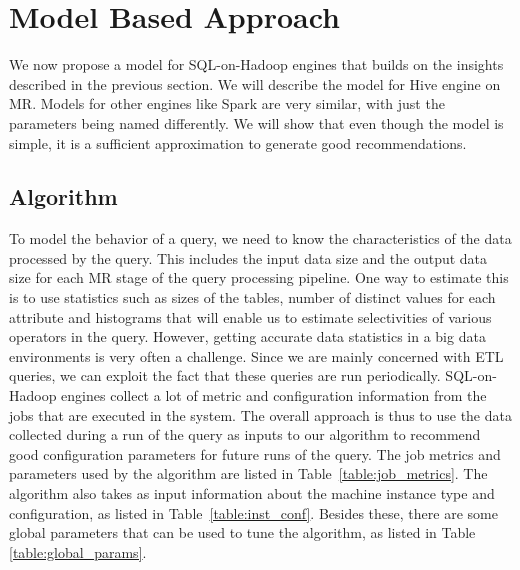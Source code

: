 \section{Model Based Approach}
\label{sec:modelbased}
We now propose a model for SQL-on-Hadoop engines that builds on the insights described in the previous section. We will describe the model for Hive engine on MR. Models for other engines like Spark are very similar, with just the parameters being named differently.  We will show that even though the model is simple, it is a sufficient approximation to generate good recommendations. 

\subsection{Algorithm}
To model the behavior of a query, we need to know the characteristics of the data processed by the query. This includes the input data size and the output data size for each MR stage of the query processing pipeline. One way to estimate this is to use statistics such as sizes of the tables, number of distinct values for each attribute and histograms that will enable us to estimate selectivities of various operators in the query. However, getting accurate data statistics in a big data environments is very often a challenge. Since we are mainly concerned with ETL queries, we can exploit the fact that these queries are run periodically. SQL-on-Hadoop engines collect a lot of metric and configuration information from the jobs that are executed in the system. The overall approach is thus to use the data collected during a run of the query as inputs to our algorithm to recommend good configuration parameters for future runs of the query. The job metrics and parameters used by the algorithm are listed in Table~\ref{table:job_metrics}. The algorithm also takes as input information about the machine instance type and configuration, as listed in Table~\ref{table:inst_conf}. Besides these, there are some global parameters that can be used to tune the algorithm, as listed in Table \ref{table:global_params}.


